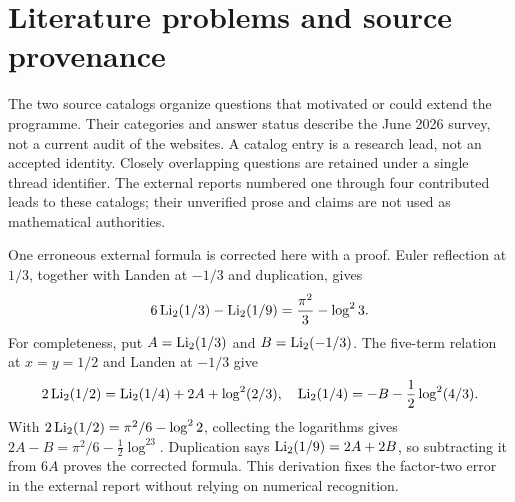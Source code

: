 \chapter{Literature problems and source provenance}\label{ch:11-literature}
The two source catalogs organize questions that motivated or could extend
the programme. Their categories and answer status describe the June 2026
survey, not a current audit of the websites. A catalog entry is a research
lead, not an accepted identity. Closely overlapping questions are retained
under a single thread identifier. The external reports numbered one through
four contributed leads to these catalogs; their unverified prose and
claims are not used as mathematical authorities.

One erroneous external formula is corrected here with a proof. Euler
reflection at $1/3$, together with Landen at $-1/3$ and duplication, gives
\[
6\operatorname{Li}_2(1/3)-\operatorname{Li}_2(1/9)=\frac{\pi^2}{3}-\log^23.
\]
For completeness, put $A=\operatorname{Li}_2(1/3)$ and $B=\operatorname{Li}_2(-1/3)$.
The five-term relation at $x=y=1/2$ and Landen at $-1/3$ give
\[
2\operatorname{Li}_2(1/2)=\operatorname{Li}_2(1/4)+2A+\log^2(2/3),\quad
\operatorname{Li}_2(1/4)=-B-\frac12\log^2(4/3).
\]
With $2\operatorname{Li}_2(1/2)=\pi^2/6-\log^22$, collecting the logarithms gives
$2A-B=\pi^2/6-\frac12\log^23$.
Duplication says $\operatorname{Li}_2(1/9)=2A+2B$, so subtracting it from $6A$
proves the corrected formula. This derivation fixes the factor-two error
in the external report without relying on numerical recognition.

